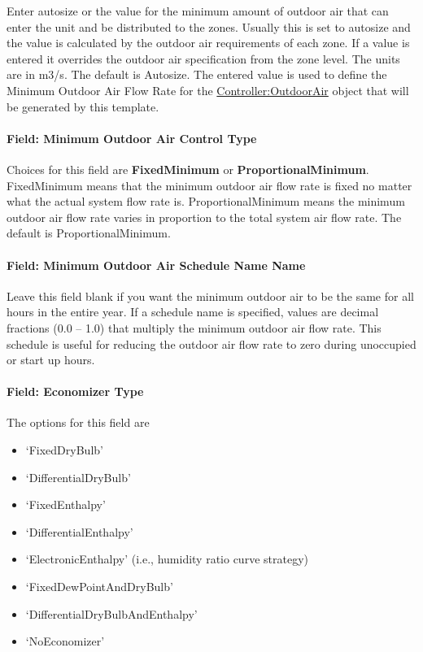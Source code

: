 Enter autosize or the value for the minimum amount of outdoor air that can enter the unit and be distributed to the zones. Usually this is set to autosize and the value is calculated by the outdoor air requirements of each zone. If a value is entered it overrides the outdoor air specification from the zone level. The units are in m3/s. The default is Autosize. The entered value is used to define the Minimum Outdoor Air Flow Rate for the \hyperref[controlleroutdoorair]{Controller:OutdoorAir} object that will be generated by this template.

\paragraph{Field: Minimum Outdoor Air Control Type}\label{field-minimum-outdoor-air-control-type}

Choices for this field are \textbf{FixedMinimum} or \textbf{ProportionalMinimum}. FixedMinimum means that the minimum outdoor air flow rate is fixed no matter what the actual system flow rate is. ProportionalMinimum means the minimum outdoor air flow rate varies in proportion to the total system air flow rate. The default is ProportionalMinimum.

\paragraph{Field: Minimum Outdoor Air Schedule Name Name}\label{field-minimum-outdoor-air-schedule-name-name}

Leave this field blank if you want the minimum outdoor air to be the same for all hours in the entire year. If a schedule name is specified, values are decimal fractions (0.0 -- 1.0) that multiply the minimum outdoor air flow rate. This schedule is useful for reducing the outdoor air flow rate to zero during unoccupied or start up hours.

\paragraph{Field: Economizer Type}\label{field-economizer-type-3}

The options for this field are

\begin{itemize}
\item
  `FixedDryBulb'
\item
  `DifferentialDryBulb'
\item
  `FixedEnthalpy'
\item
  `DifferentialEnthalpy'
\item
  `ElectronicEnthalpy' (i.e., humidity ratio curve strategy)
\item
  `FixedDewPointAndDryBulb'
\item
  `DifferentialDryBulbAndEnthalpy'
\item
  `NoEconomizer'
\end{itemize}

